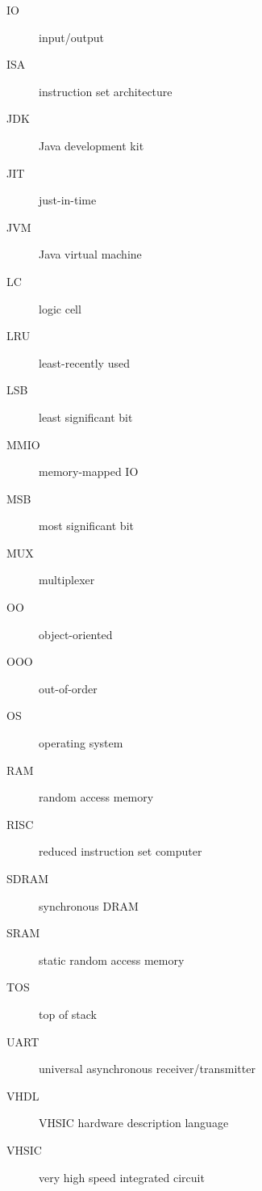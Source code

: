 \documentclass[%
    10pt,
    headinclude, footinclude=false,
    openright, %
    notitlepage,
    cleardoublepage=empty,
    headsepline,
    numbers=noenddot,
    bibliography=totoc, index=totoc,
    ]{scrbook}
\begin{document}
\begin{description}
\item [IO] input/output
\item [ISA] instruction set architecture
\item [JDK] Java development kit
\item [JIT] just-in-time
\item [JVM] Java virtual machine
\item [LC] logic cell
\item [LRU] least-recently used
\item [LSB] least significant bit
\item [MMIO] memory-mapped IO
\item [MSB] most significant bit
\item [MUX] multiplexer
\item [OO] object-oriented
\item [OOO] out-of-order
\item [OS] operating system
\item [RAM] random access memory
\item [RISC] reduced instruction set computer
\item [SDRAM] synchronous DRAM
\item [SRAM] static random access memory
\item [TOS] top of stack
\item [UART] universal asynchronous receiver/transmitter
\item [VHDL] VHSIC hardware description language
\item [VHSIC] very high speed integrated circuit
\end{description}





\hypertarget{index}{}
\printindex
\end{document}
